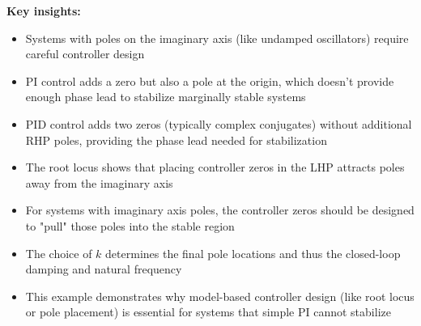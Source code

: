 \documentclass[11pt,a4paper]{article}
\begin{document}
\textbf{Key insights:}
\begin{itemize}
  \item Systems with poles on the imaginary axis (like undamped oscillators) require careful controller design
  \item PI control adds a zero but also a pole at the origin, which doesn't provide enough phase lead to stabilize marginally stable systems
  \item PID control adds two zeros (typically complex conjugates) without additional RHP poles, providing the phase lead needed for stabilization
  \item The root locus shows that placing controller zeros in the LHP attracts poles away from the imaginary axis
  \item For systems with imaginary axis poles, the controller zeros should be designed to "pull" those poles into the stable region
  \item The choice of $k$ determines the final pole locations and thus the closed-loop damping and natural frequency
  \item This example demonstrates why model-based controller design (like root locus or pole placement) is essential for systems that simple PI cannot stabilize
\end{itemize}
\end{document}
